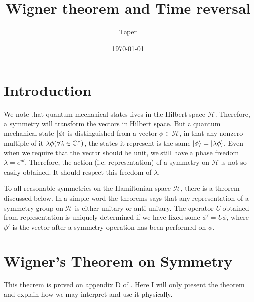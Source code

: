 \documentclass{article}
\title{Wigner theorem and Time reversal}
\date{\today}
\author{Taper}
\begin{document}
\maketitle

\tableofcontents


\section{Introduction}
\label{sec:Introduction}

We note that quantum mechanical states lives in the Hilbert space
$\mathscr{H}$.  Therefore, a
symmetry will transform the vectors in Hilbert space. But a quantum mechanical
state $\ket{\phi}$ is distinguished from a vector $\phi\in\mathscr{H}$, in that
any nonzero multiple of it $\lambda\phi (\forall \lambda\in\mathbb{C}^*)$, the states it
represent is the same $\ket{\phi}=\ket{\lambda\phi}$. Even when we require that
the vector should be unit, we still have a phase freedom $\lambda=e^{i\theta}$.
Therefore, the action
(i.e. representation) of a symmetry on $\mathscr{H}$ is not so easily obtained.
It should respect this freedom of $\lambda$.

To all reasonable symmetries on the Hamiltonian space $\mathscr{H}$, there is a
theorem discussed below. In a simple word the theorems says that any 
representation of a symmetry group on $\mathscr{H}$ is either unitary or
anti-unitary. The operator $U$ obtained from representation is uniquely
determined if we have fixed some $\phi'=U\phi$, where $\phi'$ is the vector after
a symmetry operation has been performed on $\phi$.

\section{Wigner's Theorem on Symmetry}
\label{sec:Wigner-Theorem}

This theorem is proved on appendix D of \cite{sternberg1995group}. Here I will only
present the theorem and explain how we may interpret and use it physically.
\end{document}

